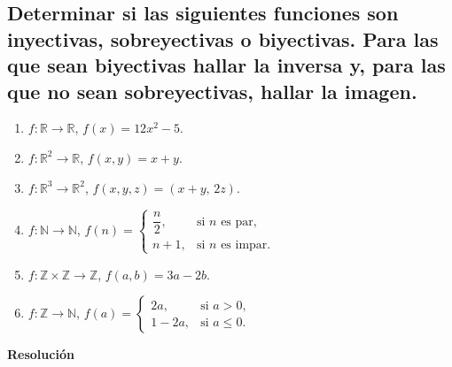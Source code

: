 \documentclass[11pt]{article}
\begin{document}
\subsection{Determinar si las siguientes funciones son inyectivas, sobreyectivas o biyectivas. Para las que sean biyectivas hallar la inversa y, para las que no sean sobreyectivas, hallar la imagen.}

\begin{enumerate}[label=\roman*)]
    \item $f:\mathbb{R}\to\mathbb{R}$, \quad $f(x)=12x^{2}-5$.
    \item $f:\mathbb{R}^{2}\to\mathbb{R}$, \quad $f(x,y)=x+y$.
    \item $f:\mathbb{R}^{3}\to\mathbb{R}^{2}$, \quad $f(x,y,z)=(x+y,\,2z)$.
    \item $f:\mathbb{N}\to\mathbb{N}$, \quad
    $f(n)=
        \begin{cases}
            \dfrac{n}{2}, & \text{si $n$ es par},\\[6pt]
            n+1, & \text{si $n$ es impar}.
        \end{cases}$
    \item $f:\mathbb{Z}\times\mathbb{Z}\to\mathbb{Z}$, \quad $f(a,b)=3a-2b$.
    \item $f:\mathbb{Z}\to\mathbb{N}$, \quad
    $f(a)=
        \begin{cases}
            2a, & \text{si } a>0,\\[4pt]
            1-2a, & \text{si } a\le 0.
        \end{cases}$
\end{enumerate}
\textbf{Resolución}
\end{document}

